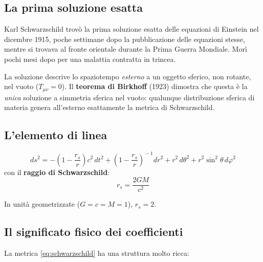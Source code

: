 \documentclass[12pt, a4paper, twoside]{article}
\newenvironment{physbox}[1]{%
  \begin{tcolorbox}[equationbox, title={#1}]
}{%
  \end{tcolorbox}
}
\theoremstyle{definition}
\newcommand{\RS}{r_{\!s}}          %
\newcommand{\munu}{{\mu\nu}}
\newcommand{\Tmunu}{T_{\munu}}
\begin{document}
\subsection{La prima soluzione esatta}

Karl Schwarzschild trovò la prima soluzione esatta delle equazioni di Einstein
nel dicembre 1915, poche settimane dopo la pubblicazione delle equazioni stesse,
mentre si trovava al fronte orientale durante la Prima Guerra Mondiale. Morì
pochi mesi dopo per una malattia contratta in trincea.

La soluzione descrive lo spaziotempo \emph{esterno} a un oggetto sferico,
non rotante, nel vuoto ($\Tmunu = 0$). Il \textbf{teorema di Birkhoff} (1923)
dimostra che questa è la \emph{unica} soluzione a simmetria sferica nel vuoto:
qualunque distribuzione sferica di materia genera all'esterno esattamente la
metrica di Schwarzschild.

\subsection{L'elemento di linea}

\begin{physbox}{Metrica di Schwarzschild}
\begin{equation}
  ds^2 = -\!\left(1 - \frac{\RS}{r}\right)c^2\,dt^2
         + \left(1 - \frac{\RS}{r}\right)^{\!\!-1} dr^2
         + r^2\,d\theta^2 + r^2\sin^2\theta\, d\varphi^2
  \label{eq:schwarzschild}
\end{equation}
con il \textbf{raggio di Schwarzschild}:
\[
  \RS = \frac{2GM}{c^2}
\]
\end{physbox}

\medskip
In unità geometrizzate ($G = c = M = 1$), $\RS = 2$.

\subsection{Il significato fisico dei coefficienti}

La metrica \eqref{eq:schwarzschild} ha una struttura molto ricca:
\end{document}
